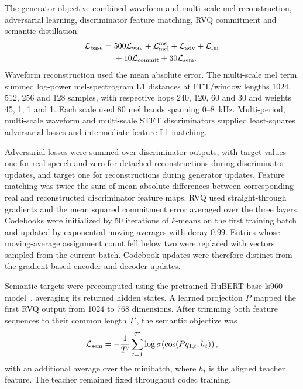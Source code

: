 The generator objective combined waveform and multi-scale mel reconstruction, adversarial learning, discriminator feature matching, RVQ commitment and semantic distillation:
\begin{equation}
\begin{split}
 \mathcal L_{\rm base}={}&500\mathcal L_{\rm wav}
 +\mathcal L_{\rm mel}^{\rm ms}
 +\mathcal L_{\rm adv}+\mathcal L_{\rm fm}\\
 &+10\mathcal L_{\rm commit}+30\mathcal L_{\rm sem}.
\end{split}
\end{equation}
Waveform reconstruction used the mean absolute error. The multi-scale mel term summed log-power mel-spectrogram L1 distances at FFT/window lengths 1024, 512, 256 and 128 samples, with respective hops 240, 120, 60 and 30 and weights 45, 1, 1 and 1. Each scale used 80 mel bands spanning 0--8~kHz. Multi-period, multi-scale waveform and multi-scale STFT discriminators supplied least-squares adversarial losses and intermediate-feature L1 matching.

Adversarial losses were summed over discriminator outputs, with target values one for real speech and zero for detached reconstructions during discriminator updates, and target one for reconstructions during generator updates. Feature matching was twice the sum of mean absolute differences between corresponding real and reconstructed discriminator feature maps. RVQ used straight-through gradients and the mean squared commitment error averaged over the three layers. Codebooks were initialized by 50 iterations of $k$-means on the first training batch and updated by exponential moving averages with decay 0.99. Entries whose moving-average assignment count fell below two were replaced with vectors sampled from the current batch. Codebook updates were therefore distinct from the gradient-based encoder and decoder updates.

Semantic targets were precomputed using the pretrained HuBERT-base-ls960 model~\cite{hubert}, averaging its returned hidden states. A learned projection $P$ mapped the first RVQ output from 1024 to 768 dimensions. After trimming both feature sequences to their common length $T'$, the semantic objective was
\begin{equation}
 \mathcal L_{\rm sem}
 =-\frac{1}{T'}\sum_{t=1}^{T'}
 \log\sigma\!\left(\cos(Pq_{1,t},h_t)\right),
\end{equation}
with an additional average over the minibatch, where $h_t$ is the aligned teacher feature. The teacher remained fixed throughout codec training.

